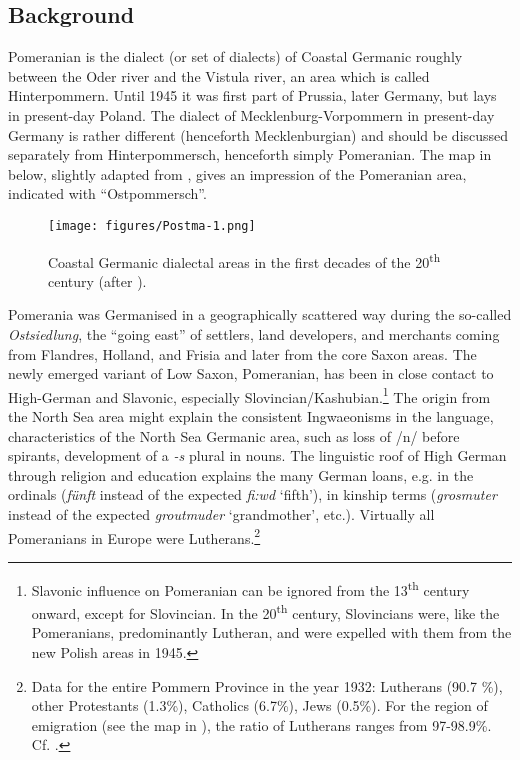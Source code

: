 \documentclass[output=paper,hidelinks,draftmode]{langscibook}
\begin{document}
\subsection{Background}

Pomeranian is the dialect (or set of dialects) of Coastal Germanic roughly between the Oder river and the Vistula river, an area which is called Hinterpommern. Until 1945 it was first part of Prussia, later Germany, but lays in present-day Poland. The dialect of Mecklenburg-Vorpommern in present-day Germany is rather different (henceforth Mecklenburgian) and should be discussed separately from Hinterpommersch, henceforth simply Pomeranian. The map in  below, slightly adapted from \citet[128]{Brockhaus2012}, gives an impression of the Pomeranian area, indicated with ``Ostpommersch''.



\begin{figure}
\texttt{[image: figures/Postma-1.png]}
  \caption{
Coastal Germanic dialectal areas in the first decades of the 20\textsuperscript{th} century (after \citealt{Brockhaus2012}). 
}\label{fig:postma:1}
\end{figure}

Pomerania was Germanised in a geographically scattered way during the so-called \textit{Ostsiedlung}, the ``going east'' of settlers, land developers, and merchants coming from Flandres, Holland, and Frisia and later from the core Saxon areas. The newly emerged variant of Low Saxon, Pomeranian, has been in close contact to High-German and Slavonic, especially Slovincian/Kashubian.\footnote{Slavonic influence on Pomeranian can be ignored from the 13\textsuperscript{th} century onward, except for Slovincian. In the 20\textsuperscript{th} century, Slovincians were, like the Pomeranians, predominantly Lutheran, and were expelled with them from the new Polish areas in 1945.} The origin from the North Sea area might explain the consistent Ingwaeonisms in the language, characteristics of the North Sea Germanic area, such as loss of /n/ before spirants, development of a \textit{-s} plural in nouns. The linguistic roof of High German through religion and education explains the many German loans, e.g. in the ordinals (\textit{fünft} instead of the expected \textit{fi:wd} {}`fifth'), in kinship terms (\textit{grosmuter} instead of the expected \textit{groutmuder} `grandmother', etc.). Virtually all Pomeranians in Europe were Lutherans.\footnote{Data for the entire Pommern Province in the year 1932: Lutherans (90.7 \%), other Protestants (1.3\%), Catholics (6.7\%), Jews (0.5\%). For the region of emigration (see the map in ), the ratio of Lutherans ranges from 97-98.9\%. Cf. \citet{GLFP1932}.}
\end{document}
